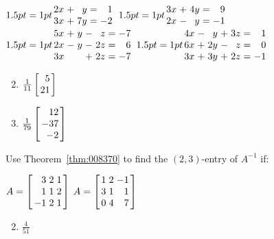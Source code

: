 \begin{multicols}{2}
\begin{ex}
\begin{exenumerate}
\exitem $\arraycolsep=1pt
\begin{array}{rrrrr}
2x & + & y  & = & 1\\
3x & + & 7y & = & -2 \end{array}
$
\exitem $\arraycolsep=1pt
\begin{array}{rrrrr}
3x & + & 4y  & = & 9 \\
2x & - & y & = & -1
\end{array} $
\exitem  $\arraycolsep=1pt
\begin{array}{rrrrrrr}
5x & + & y & - & z & = & -7 \\
2x & - & y & - & 2z & = & 6 \\
3x &  &  & + & 2z & = & -7 
\end{array} $
\exitem $\arraycolsep=1pt
\begin{array}{rrrrrrr}
4x & - & y & + & 3z & = & 1 \\
6x & + & 2y & - & z & = & 0 \\
3x & + & 3y & + & 2z & = & -1 
\end{array} $
\end{exenumerate}
\begin{sol}
\begin{enumerate}[label={\alph*.}]
\setcounter{enumi}{1}
\item  $\frac{1}{11}\leftB \begin{array}{r}
5 \\
21
\end{array}\rightB$


\setcounter{enumi}{3}
\item   $\frac{1}{79}\leftB \begin{array}{r}
12  \\
-37 \\
-2
\end{array}\rightB$


\end{enumerate}
\end{sol}
\end{ex}

\begin{ex}
Use Theorem~\ref{thm:008370} to find the $(2, 3)$-entry of $A^{-1}$ if:

\begin{exenumerate}
\exitem $ A = \leftB \begin{array}{rrr}
3 & 2 & 1 \\
1 & 1 & 2 \\
-1 & 2 & 1 
\end{array}\rightB $ 
\exitem $ A = \leftB \begin{array}{rrr}
1 & 2 & -1 \\
3 & 1 & 1 \\
0 & 4 & 7 
\end{array}\rightB $ 
\end{exenumerate}
\begin{sol}
\begin{enumerate}[label={\alph*.}]
\setcounter{enumi}{1}
\item  $\frac{4}{51}$


\end{enumerate}
\end{sol}
\end{ex}
\end{multicols}
